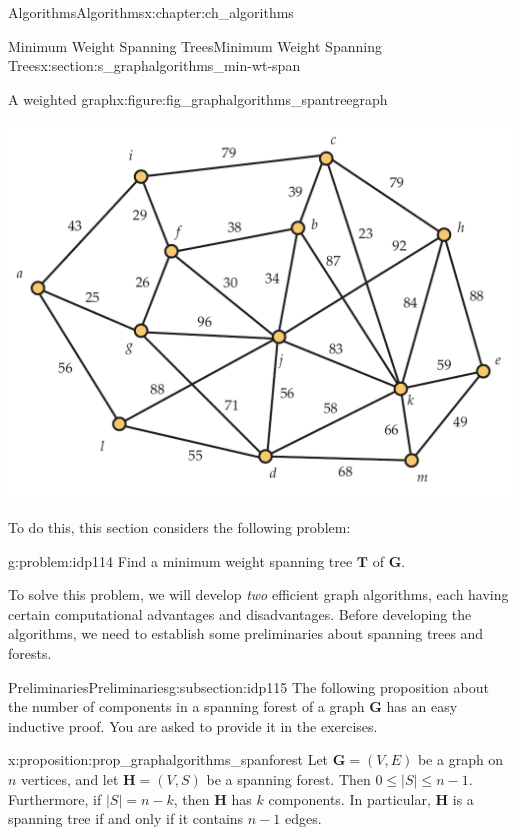 \documentclass[oneside,10pt,]{book}
\numberwithin{equation}{section}
\newcommand{\GVE}{\mathbf{G}=(V,E)}
\newcommand{\bfG}{\mathbf{G}}
\newcommand{\bfH}{\mathbf{H}}
\newcommand{\bfT}{\mathbf{T}}
\begin{document}
\begin{chapterptx}{Algorithms}{}{Algorithms}{}{}{x:chapter:ch_algorithms}
\begin{sectionptx}{Minimum Weight Spanning Trees}{}{Minimum Weight Spanning Trees}{}{}{x:section:s_graphalgorithms_min-wt-span}
\begin{introduction}{}
\begin{figureptx}{A weighted graph}{x:figure:fig_graphalgorithms_spantreegraph}{}%
\begin{image}{0.05}{0.9}{0.05}%
\includegraphics[width=\linewidth]{images/spantreegraph}
\end{image}%
\tcblower
\end{figureptx}%
To do this, this section considers the following problem:%
\begin{problem}{}{g:problem:idp114}%
Find a minimum weight spanning tree \(\bfT\) of \(\bfG\).%
\end{problem}
To solve this problem, we will develop \emph{two} efficient graph algorithms, each having certain computational advantages and disadvantages. Before developing the algorithms, we need to establish some preliminaries about spanning trees and forests.%
\end{introduction}%
%
%
\typeout{************************************************}
\typeout{************************************************}
%
\begin{subsectionptx}{Preliminaries}{}{Preliminaries}{}{}{g:subsection:idp115}
The following proposition about the number of components in a spanning forest of a graph \(\bfG\) has an easy inductive proof. You are asked to provide it in the exercises.%
\begin{proposition}{}{}{x:proposition:prop_graphalgorithms_spanforest}%
Let \(\GVE\) be a graph on \(n\) vertices, and let \(\bfH=(V,S)\) be a spanning forest. Then \(0\le |S|\le n-1\). Furthermore, if \(|S|= n-k\), then \(\bfH\) has \(k\) components. In particular, \(\bfH\) is a spanning tree if and only if it contains \(n-1\) edges.%

\end{proposition}
\end{subsectionptx}
\end{sectionptx}
\end{chapterptx}
\end{document}
